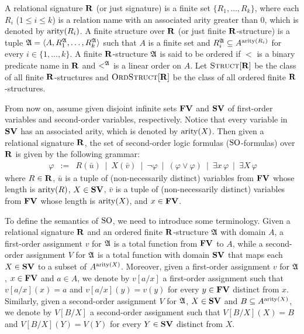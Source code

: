 
A relational signature $\mathbf{R}$ (or just signature) is a finite set $\{R_1, \ldots, R_k\}$, where each $R_i$ ($1 \leq i \leq k$) is a relation name with an associated arity greater than 0, which is denoted by ${\rm arity}(R_i)$. A finite structure over $\mathbf{R}$ (or just finite $\mathbf{R}$-structure) is a tuple $\mathfrak{A} = \langle A, R_1^{\mathfrak{A}}, \ldots, R_k^{\mathfrak{A}} \rangle$ such that $A$ is a finite set and $R_i^{\mathfrak{A}} \subseteq A^{{\rm arity}(R_i)}$ for every $i \in \{1, \ldots, k\}$. A finite $\mathbf{R}$-structure $\mathfrak{A}$ is said to be ordered if $<$ is a binary predicate name in $\mathbf{R}$ and $<^{\mathfrak{A}}$ is a linear order on $A$. Let $\text{\sc Struct}[\mathbf{R}]$ be the class of all finite $\mathbf{R}$-structures and $\text{\sc OrdStruct}[\mathbf{R}]$ be the class of all ordered finite $\mathbf{R}$-structures. 

From now on, assume given disjoint infinite sets $\mathbf{FV}$ and $\mathbf{SV}$ of first-order variables and second-order variables, respectively. Notice that every variable in $\mathbf{SV}$ has an associated arity, which is denoted by ${\rm arity}(X)$. Then given a relational signature $\mathbf{R}$, the set of second-order logic formulas (${\rm SO}$-formulas) over $\mathbf{R}$ is given by the following grammar:
\begin{eqnarray*}\ 
	\varphi &:=& R(\bar u) \ \mid\  
	X(\bar v)  \ \mid\ 
	\neg \varphi \ \mid\ 
	(\varphi \vee \varphi) \ \mid\ 
	\exists x \, \varphi \ \mid\ 
	\exists X \, \varphi
\end{eqnarray*}
where $R \in \mathbf{R}$, $\bar u$ is a tuple of (non-necessarily distinct) variables from $\mathbf{FV}$ whose length is ${\rm arity}(R)$, $X \in \mathbf{SV}$, $\bar v$ is a tuple of (non-necessarily distinct) variables from $\mathbf{FV}$ whose length is ${\rm arity}(X)$, and $x \in \mathbf{FV}$. 



To define the semantics of ${\rm SO}$, we need to introduce some terminology. Given a relational signature $\mathbf{R}$ and an ordered finite $\mathbf{R}$-structure $\mathfrak{A}$ with domain $A$, a first-order assignment $v$ for $\mathfrak{A}$ is a total function from $\mathbf{FV}$ to $A$, while a second-order assignment $V$ for $\mathfrak{A}$ is a total function with domain $\mathbf{SV}$ that maps each $X \in \mathbf{SV}$ to a subset of $A^{{\rm arity}(X)}$. Moreover, given a first-order assignment $v$ for $\mathfrak{A}$, $x \in \mathbf{FV}$ and $a \in A$, we denote by $v[a/x]$ a first-order assignment such that $v[a/x](x) = a$ and $v[a/x](y) = v(y)$ for every $y \in \mathbf{FV}$ distinct from $x$. Similarly, given a second-order assignment $V$ for $\mathfrak{A}$, $X \in \mathbf{SV}$ and $B  \subseteq A^{{\rm arity}(X)}$, we denote by $V[B/X]$ a second-order assignment such that $V[B/X](X) = B$ and $V[B/X](Y) = V(Y)$ for every $Y \in \mathbf{SV}$ distinct from $X$. 

